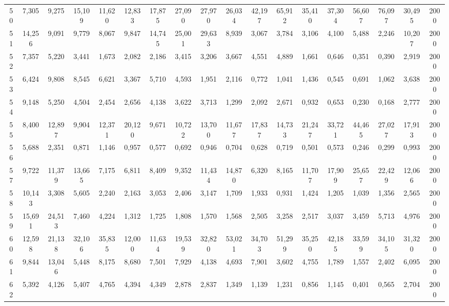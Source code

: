 {\begin{longtable}{ >{\tiny}cccccccccccccccccc}
50  & 7,305  & 9,275  & 15,109 & 11,620 & 12,833 & 17,875 & 27,090 & 27,970 & 26,034 & 42,197 & 65,912 & 35,410  & 37,304  & 56,607  & 76,097  & 30,495  & 2000 \\
51  & 14,256 & 9,091  & 9,779  & 8,067  & 9,847  & 14,745 & 25,001 & 29,633 & 8,939  & 3,067  & 3,784  & 3,106   & 4,100   & 5,488   & 2,246   & 10,207  & 2000 \\
52  & 7,357  & 5,220  & 3,441  & 1,673  & 2,082  & 2,186  & 3,415  & 3,206  & 3,667  & 4,551  & 4,889  & 1,661   & 0,646   & 0,351   & 0,390   & 2,919   & 2000 \\
53  & 6,424  & 9,808  & 8,545  & 6,621  & 3,367  & 5,710  & 4,593  & 1,951  & 2,116  & 0,772  & 1,041  & 1,436   & 0,545   & 0,691   & 1,062   & 3,638   & 2000 \\
54  & 9,148  & 5,250  & 4,504  & 2,454  & 2,656  & 4,138  & 3,622  & 3,713  & 1,299  & 2,092  & 2,671  & 0,932   & 0,653   & 0,230   & 0,168   & 2,777   & 2000 \\
55  & 8,400  & 12,897 & 9,904  & 12,371 & 20,120 & 9,671  & 10,722 & 13,700 & 11,677 & 17,837 & 14,733 & 21,247  & 33,721  & 44,465  & 27,027  & 17,913  & 2000 \\
56  & 5,688  & 2,351  & 0,871  & 1,146  & 0,957  & 0,577  & 0,692  & 0,946  & 0,704  & 0,628  & 0,719  & 0,501   & 0,573   & 0,246   & 0,299   & 0,993   & 2000 \\
57  & 9,722  & 11,379 & 13,665 & 7,175  & 6,811  & 8,409  & 9,352  & 11,434 & 14,870 & 6,320  & 8,165  & 11,707  & 17,909  & 25,657  & 22,429  & 12,066  & 2000 \\
58  & 10,143 & 3,308  & 5,605  & 2,240  & 2,163  & 3,053  & 2,406  & 3,147  & 1,709  & 1,933  & 0,931  & 1,424   & 1,205   & 1,039   & 1,356   & 2,565   & 2000 \\
59  & 15,691 & 24,513 & 7,460  & 4,224  & 1,312  & 1,725  & 1,808  & 1,570  & 1,568  & 2,505  & 3,258  & 2,517   & 3,037   & 3,459   & 5,713   & 4,976   & 2000 \\
60  & 12,598 & 21,138 & 32,106 & 35,835 & 12,000 & 11,634 & 19,539 & 32,820 & 53,021 & 34,703 & 51,299 & 35,250  & 42,185  & 33,599  & 34,105  & 31,320  & 2000 \\
61  & 9,844  & 13,046 & 5,448  & 8,175  & 8,680  & 7,501  & 7,929  & 4,138  & 4,693  & 7,901  & 3,602  & 4,755   & 1,789   & 1,557   & 2,402   & 6,095   & 2000 \\
62  & 5,392  & 4,126  & 5,407  & 4,765  & 4,394  & 4,349  & 2,878  & 2,837  & 1,349  & 1,139  & 1,231  & 0,856   & 1,145   & 0,401   & 0,565   & 2,704   & 2000 \\

\end{longtable}}
